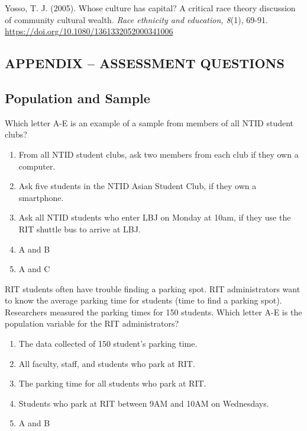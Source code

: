 \documentclass[11.5pt]{sig-alternate} %
\begin{document}
Yosso, T. J. (2005). Whose culture has capital? A critical race theory discussion of community cultural wealth. \textit{Race ethnicity and education, 8}(1), 69-91. \url{https://doi.org/10.1080/1361332052000341006} 

\clearpage
\onecolumn
\begin{large}

\leftskip 0in
\parindent 0in 

\section*{APPENDIX – ASSESSMENT QUESTIONS}

\subsection*{Population and Sample}

Which letter A-E is an example of a sample from members of all NTID student clubs? 
\begin{enumerate}[label=\Alph*.]
    \item From all NTID student clubs, ask two members from each club if they own a computer.
    \item Ask five students in the NTID Asian Student Club, if they own a smartphone.
    \item Ask all NTID students who enter LBJ on Monday at 10am, if they use the RIT shuttle bus to arrive at LBJ.
    \item A and B
    \item A and C
\end{enumerate}

RIT students often have trouble finding a parking spot. RIT administrators want to know the average parking time for students (time to find a parking spot). Researchers measured the parking times for 150 students. Which letter A-E is the population variable for the RIT administrators?
\begin{enumerate}[label=\Alph*.]
    \item The data collected of 150 student’s parking time.
    \item All faculty, staff, and students who park at RIT.
    \item The parking time for all students who park at RIT.
    \item Students who park at RIT between 9AM and 10AM on Wednesdays.
    \item A and B
\end{enumerate}
 

\end{large}
\end{document}
